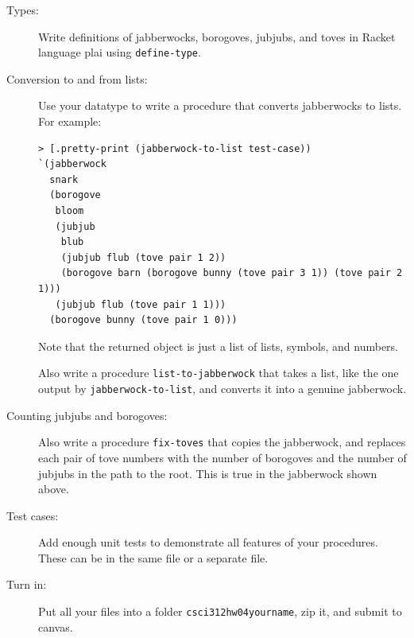 \documentclass{article}
\begin{document}
\begin{description}

\newpage

\item[Types:]
Write 
definitions of jabberwocks, borogoves, jubjubs, and toves
 in Racket language plai using {\tt define-type}.  

\item[Conversion to and from lists:]
Use your datatype to write a  procedure that converts
jabberwocks to lists.  For example:
\begin{lstlisting}
> [.pretty-print (jabberwock-to-list test-case))
`(jabberwock
  snark
  (borogove
   bloom
   (jubjub
    blub
    (jubjub flub (tove pair 1 2))
    (borogove barn (borogove bunny (tove pair 3 1)) (tove pair 2 1)))
   (jubjub flub (tove pair 1 1)))
  (borogove bunny (tove pair 1 0)))
\end{lstlisting}
Note that the returned object is just a list of lists, symbols, and numbers.

Also write a procedure {\tt list-to-jabberwock} that takes a list, like the
one output by {\tt jabberwock-to-list}, and converts it into a genuine
jabberwock.

\item[Counting jubjubs and borogoves:]
 Also write a procedure {\tt fix-toves} that copies the
jabberwock, and replaces each pair of tove numbers with 
the number of borogoves and the number of jubjubs in the path
to the root.  This is true in the
jabberwock shown above.

\item[Test cases:]  Add enough unit tests to demonstrate
all features of your procedures.  These can be in the same
file or a separate file.


\item[Turn in:] Put all your files into a folder {\tt csci312hw04yourname},
zip it, and submit to canvas.


\end{description}
\end{document}
